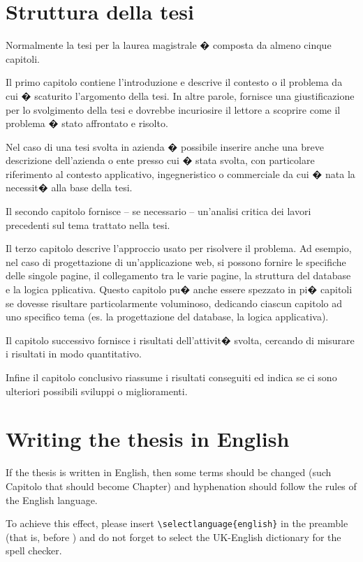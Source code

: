 \section{Struttura della tesi}

Normalmente la tesi per la laurea magistrale � composta da almeno cinque capitoli.

Il primo capitolo contiene l'introduzione e descrive il contesto o il problema da cui � scaturito l'argomento della tesi.
In altre parole, fornisce una giustificazione per lo svolgimento della tesi e dovrebbe incuriosire il lettore a scoprire come il problema � stato affrontato e risolto.

Nel caso di una tesi svolta in azienda � possibile inserire anche una breve descrizione dell'azienda o ente presso cui � stata svolta, con particolare riferimento al contesto applicativo, ingegneristico o commerciale da cui � nata la necessit� alla base della tesi.

Il secondo capitolo fornisce -- se necessario -- un'analisi critica dei lavori precedenti sul tema trattato nella tesi.

Il terzo capitolo descrive l'approccio usato per risolvere il problema. Ad esempio, nel caso di progettazione di un'applicazione web, si possono fornire le specifiche delle singole pagine, il collegamento tra le varie pagine, la struttura del database e la logica pplicativa.
Questo capitolo pu� anche essere spezzato in pi� capitoli se dovesse risultare particolarmente voluminoso, dedicando ciascun capitolo ad uno specifico tema (es. la progettazione del database, la logica applicativa).

Il capitolo successivo fornisce i risultati dell'attivit� svolta, cercando di misurare i risultati in modo quantitativo.

Infine il capitolo conclusivo riassume i risultati conseguiti ed indica se ci sono ulteriori possibili sviluppi o miglioramenti.

\section{Writing the thesis in English}

If the thesis is written in English, then some terms should be changed (such Capitolo that should become Chapter) and hyphenation should follow the rules of the English language.

To achieve this effect, please insert \verb+\selectlanguage{english}+ in the preamble
(that is, before \verb++) and do not forget to select the UK-English dictionary for the spell checker.
